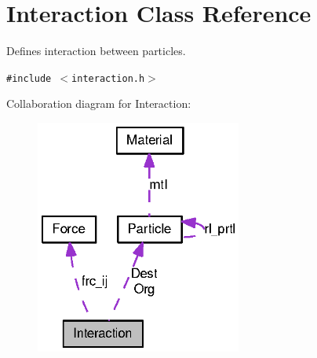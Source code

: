\hypertarget{classInteraction}{
\section{Interaction Class Reference}
\label{classInteraction}
}
Defines interaction between particles.  


{\tt \#include $<$interaction.h$>$}

Collaboration diagram for Interaction:\nopagebreak
\begin{figure}[H]
\begin{center}
\leavevmode
\includegraphics[width=192pt]{classInteraction__coll__graph}
\end{center}
\end{figure}
